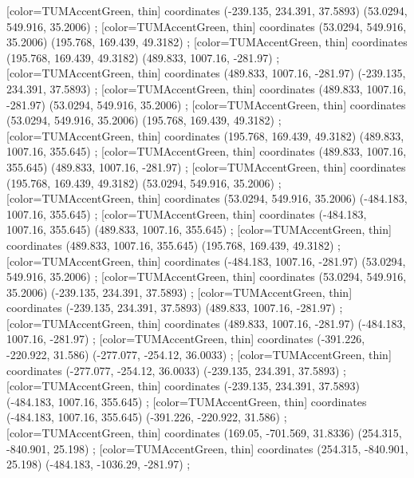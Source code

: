         [color=TUMAccentGreen, thin] coordinates { (-239.135, 234.391, 37.5893) (53.0294, 549.916, 35.2006) };
        [color=TUMAccentGreen, thin] coordinates { (53.0294, 549.916, 35.2006) (195.768, 169.439, 49.3182) };
        [color=TUMAccentGreen, thin] coordinates { (195.768, 169.439, 49.3182) (489.833, 1007.16, -281.97) };
        [color=TUMAccentGreen, thin] coordinates { (489.833, 1007.16, -281.97) (-239.135, 234.391, 37.5893) };
        [color=TUMAccentGreen, thin] coordinates { (489.833, 1007.16, -281.97) (53.0294, 549.916, 35.2006) };
        [color=TUMAccentGreen, thin] coordinates { (53.0294, 549.916, 35.2006) (195.768, 169.439, 49.3182) };
        [color=TUMAccentGreen, thin] coordinates { (195.768, 169.439, 49.3182) (489.833, 1007.16, 355.645) };
        [color=TUMAccentGreen, thin] coordinates { (489.833, 1007.16, 355.645) (489.833, 1007.16, -281.97) };
        [color=TUMAccentGreen, thin] coordinates { (195.768, 169.439, 49.3182) (53.0294, 549.916, 35.2006) };
        [color=TUMAccentGreen, thin] coordinates { (53.0294, 549.916, 35.2006) (-484.183, 1007.16, 355.645) };
        [color=TUMAccentGreen, thin] coordinates { (-484.183, 1007.16, 355.645) (489.833, 1007.16, 355.645) };
        [color=TUMAccentGreen, thin] coordinates { (489.833, 1007.16, 355.645) (195.768, 169.439, 49.3182) };
        [color=TUMAccentGreen, thin] coordinates { (-484.183, 1007.16, -281.97) (53.0294, 549.916, 35.2006) };
        [color=TUMAccentGreen, thin] coordinates { (53.0294, 549.916, 35.2006) (-239.135, 234.391, 37.5893) };
        [color=TUMAccentGreen, thin] coordinates { (-239.135, 234.391, 37.5893) (489.833, 1007.16, -281.97) };
        [color=TUMAccentGreen, thin] coordinates { (489.833, 1007.16, -281.97) (-484.183, 1007.16, -281.97) };
        [color=TUMAccentGreen, thin] coordinates { (-391.226, -220.922, 31.586) (-277.077, -254.12, 36.0033) };
        [color=TUMAccentGreen, thin] coordinates { (-277.077, -254.12, 36.0033) (-239.135, 234.391, 37.5893) };
        [color=TUMAccentGreen, thin] coordinates { (-239.135, 234.391, 37.5893) (-484.183, 1007.16, 355.645) };
        [color=TUMAccentGreen, thin] coordinates { (-484.183, 1007.16, 355.645) (-391.226, -220.922, 31.586) };
        [color=TUMAccentGreen, thin] coordinates { (169.05, -701.569, 31.8336) (254.315, -840.901, 25.198) };
        [color=TUMAccentGreen, thin] coordinates { (254.315, -840.901, 25.198) (-484.183, -1036.29, -281.97) };
